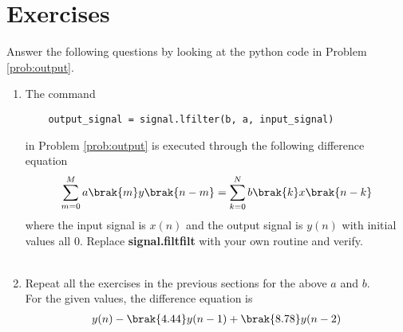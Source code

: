 \documentclass[journal,12pt,twocolumn]{IEEEtran}
\renewcommand\thesection{\arabic{section}}
\begin{document}
\section{Exercises}
Answer the following questions by looking at the python code in Problem \ref{prob:output}.
\begin{enumerate}[label=\thesection.\arabic*]
\item
The command
\begin{lstlisting}
	output_signal = signal.lfilter(b, a, input_signal)
	\end{lstlisting}
in Problem \ref{prob:output} is executed through the following difference equation
\begin{equation}
\label{eq:iir_filter_gen}
 \sum _{m=0}^{M}a\brak{m}y\brak{n-m}=\sum _{k=0}^{N}b\brak{k}x\brak{n-k}
\end{equation}
%
where the input signal is $x(n)$ and the output signal is $y(n)$ with initial values all 0. Replace
\textbf{signal.filtfilt} with your own routine and verify.
\\\solution\\

%
\item Repeat all the exercises in the previous sections for the above $a$ and $b$.
\\
\solution
For the given values, the difference equation is
\begin{align}
	&y(n) - \brak{4.44}y(n - 1) + \brak{8.78}y(n - 2) \nonumber \\

\end{align}
\end{enumerate}
\end{document}
